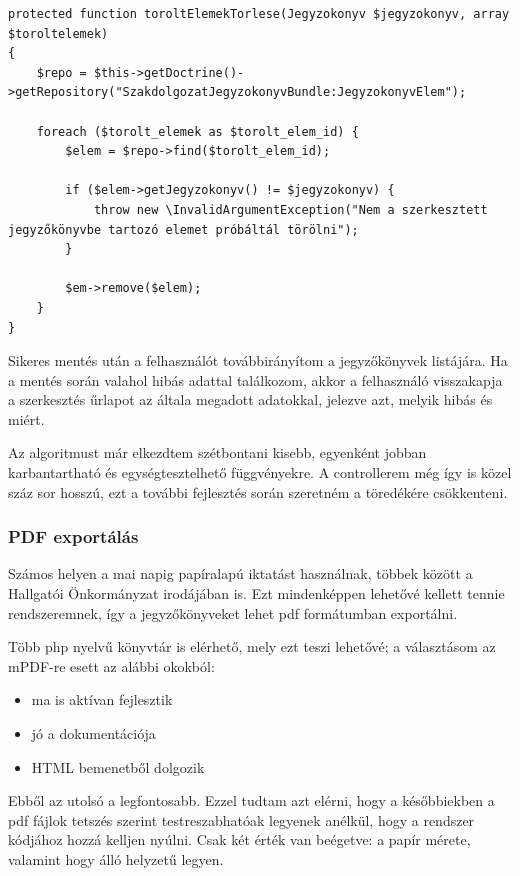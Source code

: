\documentclass[a4paper,12pt,oneside]{report}
\begin{document}
\begin{lstlisting}
protected function toroltElemekTorlese(Jegyzokonyv $jegyzokonyv, array $toroltelemek)
{
    $repo = $this->getDoctrine()->getRepository("SzakdolgozatJegyzokonyvBundle:JegyzokonyvElem");

    foreach ($torolt_elemek as $torolt_elem_id) {
        $elem = $repo->find($torolt_elem_id);

        if ($elem->getJegyzokonyv() != $jegyzokonyv) {
            throw new \InvalidArgumentException("Nem a szerkesztett jegyzőkönyvbe tartozó elemet próbáltál törölni");
        }

        $em->remove($elem);
    }
}
\end{lstlisting}

Sikeres mentés után a felhasználót továbbirányítom a jegyzőkönyvek listájára. Ha a mentés során valahol hibás adattal találkozom, akkor a felhasználó visszakapja a szerkesztés űrlapot az általa megadott adatokkal, jelezve azt, melyik hibás és miért.

Az algoritmust már elkezdtem szétbontani kisebb, egyenként jobban karbantartható és egységtesztelhető függvényekre. A controllerem még így is közel száz sor hosszú, ezt a további fejlesztés során szeretném a töredékére csökkenteni.

\subsubsection*{PDF exportálás}

Számos helyen a mai napig papíralapú iktatást használnak, többek között a Hallgatói Önkormányzat irodájában is. Ezt mindenképpen lehetővé kellett tennie rendszeremnek, így a jegyzőkönyveket lehet pdf formátumban exportálni.

Több php nyelvű könyvtár is elérhető, mely ezt teszi lehetővé; a választásom az mPDF-re esett az alábbi okokból:

\begin{itemize}
    \item ma is aktívan fejlesztik
    \item jó a dokumentációja
    \item HTML bemenetből dolgozik
\end{itemize}

Ebből az utolsó a legfontosabb. Ezzel tudtam azt elérni, hogy a későbbiekben a pdf fájlok tetszés szerint testreszabhatóak legyenek anélkül, hogy a rendszer kódjához hozzá kelljen nyúlni. Csak két érték van beégetve: a papír mérete, valamint hogy álló helyzetű legyen.
\end{document}
